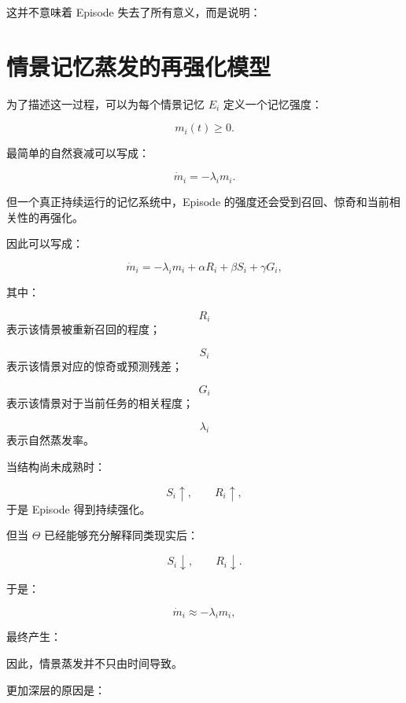 这并不意味着 Episode 失去了所有意义，而是说明：

\begin{statementbox}
\centering
{}
\end{statementbox}

\section{情景记忆蒸发的再强化模型}

为了描述这一过程，可以为每个情景记忆 $E_i$ 定义一个记忆强度：

\[
m_i(t)\geq 0.
\]

最简单的自然衰减可以写成：

\[
\dot m_i
=
-\lambda_i m_i.
\]

但一个真正持续运行的记忆系统中，Episode 的强度还会受到召回、惊奇和当前相关性的再强化。

因此可以写成：

\[
\boxed{
\dot m_i
=
-\lambda_i m_i
+
\alpha R_i
+
\beta S_i
+
\gamma G_i,
}
\]

其中：

\[
R_i
\]
表示该情景被重新召回的程度；

\[
S_i
\]
表示该情景对应的惊奇或预测残差；

\[
G_i
\]
表示该情景对于当前任务的相关程度；

\[
\lambda_i
\]
表示自然蒸发率。

当结构尚未成熟时：

\[
S_i\uparrow,
\qquad
R_i\uparrow,
\]
于是 Episode 得到持续强化。

但当 $\Theta$ 已经能够充分解释同类现实后：

\[
S_i\downarrow,
\qquad
R_i\downarrow.
\]

于是：

\[
\dot m_i
\approx
-\lambda_i m_i,
\]

最终产生：

\begin{statementbox}
\centering
{}
\end{statementbox}

因此，情景蒸发并不只由时间导致。

更加深层的原因是：

\begin{statementbox}
\centering
{}
\end{statementbox}

